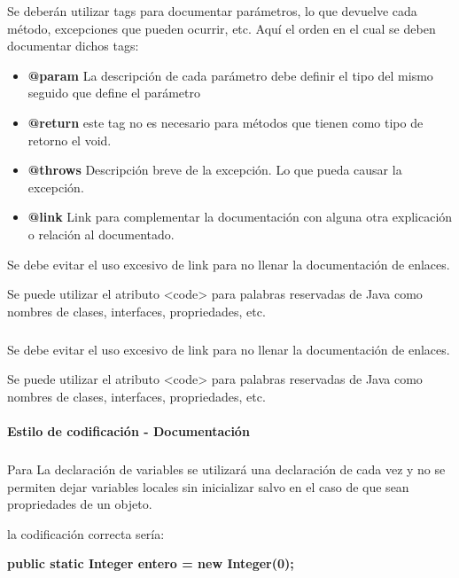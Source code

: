 Se deberán utilizar tags para documentar parámetros, lo que devuelve
cada método, excepciones que pueden ocurrir, etc. Aquí el orden en el
cual se deben documentar dichos tags:

\begin{itemize}
\item \textbf{@param } La descripción de cada parámetro debe definir
  el tipo del mismo seguido que define el parámetro
\item \textbf{@return } este tag no es necesario para métodos que
  tienen como tipo de retorno el void.
\item \textbf{@throws } Descripción breve de la excepción. Lo que
  pueda causar la excepción.
\item \textbf{@link } Link para complementar la documentación con
  alguna otra explicación o relación al documentado.
\end{itemize}

Se debe evitar el uso excesivo de link para no llenar la documentación
de enlaces.

Se puede utilizar el atributo <code> para palabras reservadas de Java
como nombres de clases, interfaces, propriedades, etc.


\subparagraph{}
Se debe evitar el uso excesivo de link para no llenar la documentación
de enlaces.

Se puede utilizar el atributo <code> para palabras reservadas de Java
como nombres de clases, interfaces, propriedades, etc.

\paragraph{Estilo de codificación - Documentación}
\subparagraph{}
Para La declaración de variables se utilizará una declaración de cada
vez y no se permiten dejar variables locales sin inicializar salvo en
el caso de que sean propriedades de un objeto.

la codificación correcta sería:

\textbf{public static Integer entero = new Integer(0);}
